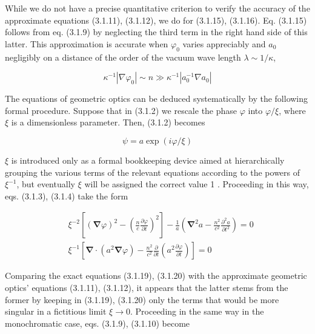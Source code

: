 \documentclass{article}
\begin{document}
While we do not have a precise quantitative criterion to verify the accuracy of the approximate equations (3.1.11), (3.1.12), we do for (3.1.15), (3.1.16). Eq. (3.1.15) follows from eq. (3.1.9) by neglecting the third term in the right hand side of this latter. This approximation is accurate when $\varphi_{0}$ varies appreciably and $a_{0}$ negligibly on a distance of the order of the vacuum wave length $\lambda \sim 1 / \kappa$,
 
\begin{equation*}
\kappa^{-1}\left|\nabla \varphi_{0}\right| \sim n \gg \kappa^{-1}\left|a_{0}^{-1} \nabla a_{0}\right| \tag{3.1.17}
\end{equation*}
 

The equations of geometric optics can be deduced systematically by the following formal procedure. Suppose that in (3.1.2) we rescale the phase $\varphi$ into $\varphi / \xi$, where $\xi$ is a dimensionless parameter. Then, (3.1.2) becomes
 
\begin{equation*}
\psi=a \exp (i \varphi / \xi) \tag{3.1.18}
\end{equation*}
 
$\xi$ is introduced only as a formal bookkeeping device aimed at hierarchically grouping the various terms of the relevant equations according to the powers of $\xi^{-1}$, but eventually $\xi$ will be assigned the correct value 1 . Proceeding in this way, eqs. (3.1.3), (3.1.4) take the form
 
\begin{align*}
& \xi^{-2}\left[(\boldsymbol{\nabla} \varphi)^{2}-\left(\frac{n}{c} \frac{\partial \varphi}{\partial t}\right)^{2}\right]-\frac{1}{a}\left(\boldsymbol{\nabla}^{2} a-\frac{n^{2}}{c^{2}} \frac{\partial^{2} a}{\partial t^{2}}\right)=0  \tag{3.1.19}\\
& \xi^{-1}\left[\boldsymbol{\nabla} \cdot\left(a^{2} \boldsymbol{\nabla} \varphi\right)-\frac{n^{2}}{c^{2}} \frac{\partial}{\partial t}\left(a^{2} \frac{\partial \varphi}{\partial t}\right)\right]=0 \tag{3.1.20}
\end{align*}
 

Comparing the exact equations (3.1.19), (3.1.20) with the approximate geometric optics' equations (3.1.11), (3.1.12), it appears that the latter stems from the former by keeping in (3.1.19), (3.1.20) only the terms that would be more singular in a fictitious limit $\xi \rightarrow 0$. Proceeding in the same way in the monochromatic case, eqs. (3.1.9), (3.1.10) become
\end{document}

